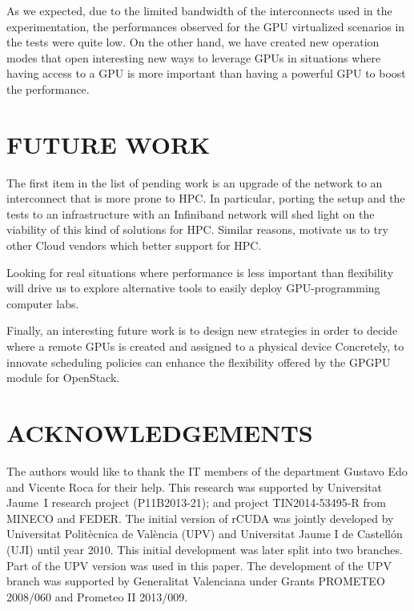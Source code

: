 \documentclass[a4paper,twoside]{article}
\begin{document}
As we expected, due to the limited bandwidth of the interconnects used in the experimentation, the performances observed for the GPU virtualized scenarios in the tests were quite low.
On the other hand, we have created new operation modes that open interesting new ways to leverage GPUs in situations where having access to a GPU is more important than having a powerful GPU to boost the performance.

\section{\uppercase{Future work}}
\label{sec:future}
The first item in the list of pending work is an upgrade of the network to an interconnect that is more prone to HPC.
In particular, porting the setup and the tests to an infrastructure with an Infiniband network will shed light on the viability of this kind of solutions for HPC.
Similar reasons, motivate us to try other Cloud vendors which better support for HPC.

Looking for real situations where performance is less important than flexibility will drive us to explore alternative tools to easily deploy GPU-programming computer labs.

Finally, an interesting future work is to design new strategies in order to decide where a remote GPUs is created and assigned to a physical device
Concretely, to innovate scheduling policies can enhance the flexibility offered by the GPGPU module for OpenStack.

\section*{\uppercase{Acknowledgements}}
The authors would like to thank the IT members of the department Gustavo Edo and Vicente Roca for their help.
This research was supported by Universitat Jaume~I research project (P11B2013-21); and project
TIN2014-53495-R from MINECO and FEDER.
The initial version of rCUDA was jointly developed by Universitat Polit\`ecnica de 
Val\`encia (UPV) and Universitat Jaume I de Castell\'on (UJI) until year 2010. 
This initial development was later split into two branches. Part of the 
UPV version was used in this paper. The development of the UPV branch 
was supported by Generalitat Valenciana under Grants PROMETEO 2008/060 
and Prometeo II 2013/009. 

{\small
}
\end{document}
